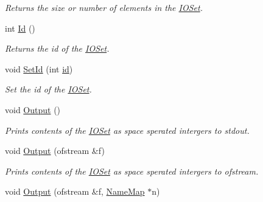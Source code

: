 \begin{DoxyCompactItemize}
\begin{DoxyCompactList}\small\item\em Returns the size or number of elements in the \hyperlink{class_i_o_set}{IOSet}. \item\end{DoxyCompactList}\item 
\hypertarget{class_i_o_set_aab9b694aacc43beacfcb4904478b9161}{
int \hyperlink{class_i_o_set_aab9b694aacc43beacfcb4904478b9161}{Id} ()}
\label{class_i_o_set_aab9b694aacc43beacfcb4904478b9161}

\begin{DoxyCompactList}\small\item\em Returns the id of the \hyperlink{class_i_o_set}{IOSet}. \item\end{DoxyCompactList}\item 
\hypertarget{class_i_o_set_a056e472b53a9a9bf83758ecae590d880}{
void \hyperlink{class_i_o_set_a056e472b53a9a9bf83758ecae590d880}{SetId} (int \hyperlink{class_i_o_set_aec085771a7d9c730275ab9cf08e3feed}{id})}
\label{class_i_o_set_a056e472b53a9a9bf83758ecae590d880}

\begin{DoxyCompactList}\small\item\em Set the id of the \hyperlink{class_i_o_set}{IOSet}. \item\end{DoxyCompactList}\item 
\hypertarget{class_i_o_set_a6dcbafab8dcc9533167e36078ac24e7e}{
void \hyperlink{class_i_o_set_a6dcbafab8dcc9533167e36078ac24e7e}{Output} ()}
\label{class_i_o_set_a6dcbafab8dcc9533167e36078ac24e7e}

\begin{DoxyCompactList}\small\item\em Prints contents of the \hyperlink{class_i_o_set}{IOSet} as space sperated intergers to stdout. \item\end{DoxyCompactList}\item 
\hypertarget{class_i_o_set_ae8a565049da3d6912e5da49af796d457}{
void \hyperlink{class_i_o_set_ae8a565049da3d6912e5da49af796d457}{Output} (ofstream \&f)}
\label{class_i_o_set_ae8a565049da3d6912e5da49af796d457}

\begin{DoxyCompactList}\small\item\em Prints contents of the \hyperlink{class_i_o_set}{IOSet} as space sperated intergers to ofstream. \item\end{DoxyCompactList}\item 
\hypertarget{class_i_o_set_a7c47a724e56e8502f8b0225c471d8592}{
void \hyperlink{class_i_o_set_a7c47a724e56e8502f8b0225c471d8592}{Output} (ofstream \&f, \hyperlink{class_name_map}{NameMap} $\ast$n)}
\label{class_i_o_set_a7c47a724e56e8502f8b0225c471d8592}


\end{DoxyCompactItemize}
